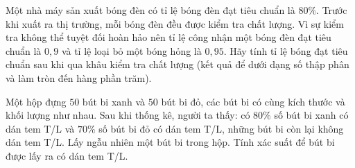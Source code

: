 \begin{bt}%
	Một nhà máy  sản xuất bóng đèn có tỉ lệ bóng đèn đạt tiêu chuẩn là $80\%$. Trước khi xuất ra thị trường, mỗi bóng đèn đều được kiểm tra chất lượng. Vì sự kiểm tra không thể tuyệt đối hoàn hảo nên tỉ lệ công nhận một bóng đèn đạt tiêu chuẩn là $0{,}9$ và tỉ lệ loại bỏ một bóng hỏng là $0{,}95$. Hãy tính tỉ lệ bóng đạt tiêu chuẩn sau khi qua khâu kiểm tra chất lượng (kết quả để dưới dạng số thập phân và làm tròn đến hàng phần trăm).
\end{bt}

\begin{bt}%
	Một hộp đựng $50$ bút bi xanh và $50$ bút bi đỏ, các bút bi có cùng kích  thước và khối lượng như nhau. Sau khi thống kê, người ta thấy: có $80\%$ số bút bi xanh có dán tem T/L và $70\%$ số bút bi đỏ có dán tem T/L, những bút bi còn lại không dán tem T/L. Lấy ngẫu nhiên một bút bi trong hộp. Tính xác suất để bút bi được lấy ra có dán tem T/L.
\end{bt}

